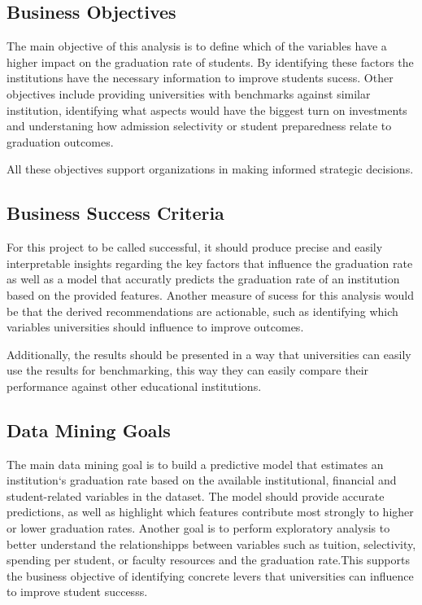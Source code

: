 \documentclass[sigconf]{acmart}
\begin{document}
\subsection{Business Objectives}
The main objective of this analysis is to define which of the variables
have a higher impact on the graduation rate of students. By identifying
these factors the institutions have the necessary information to improve
students sucess. Other objectives include providing universities with
benchmarks against similar institution, identifying what aspects would
have the biggest turn on investments and understaning how admission selectivity
or student preparedness relate to graduation outcomes.

All these objectives support organizations in making informed strategic decisions.
\subsection{Business Success Criteria}
For this project to be called successful, it should produce  precise
 and easily interpretable insights regarding the key factors that influence
 the graduation rate as well as a model that accuratly predicts
the graduation rate of an institution based on the provided features. Another
measure of sucess for this analysis would be that the derived recommendations
are actionable, such as identifying which variables universities should
influence to improve outcomes.

Additionally, the results should be presented in a way  that universities
can easily use the results for benchmarking, this way they can easily
compare their performance against other educational institutions.
\subsection{Data Mining Goals}
The main data mining goal is to build a predictive model that estimates
an institution`s graduation rate based on the available institutional,
financial and student-related variables in the dataset. The model should
provide accurate predictions, as well as highlight which features
contribute most strongly to higher or lower graduation rates. Another
goal is to perform exploratory analysis to better understand the relationshipps
between variables such as tuition, selectivity, spending per student,
or faculty resources and the graduation rate.This supports the business
objective of identifying concrete levers that universities can influence
 to improve student successs.
\end{document}
